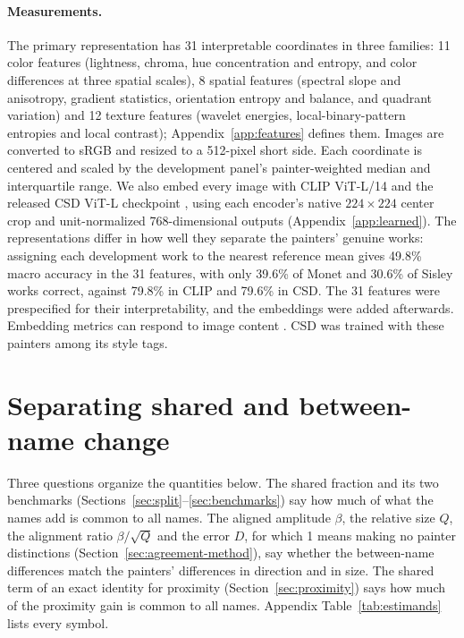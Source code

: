 \documentclass[10pt]{article}
\begin{document}
\paragraph{Measurements.}
The primary representation has 31 interpretable coordinates in three families: 11 color features
(lightness, chroma, hue concentration and entropy, and color differences at three spatial
scales), 8 spatial features (spectral slope and anisotropy, gradient statistics, orientation
entropy and balance, and quadrant variation) and 12 texture features (wavelet energies,
local-binary-pattern entropies and local contrast); Appendix~\ref{app:features} defines them.
Images are converted to sRGB and resized to a 512-pixel short side. Each coordinate is centered
and scaled by the development panel's painter-weighted median and interquartile range. We also
embed every image with CLIP ViT-L/14 \citep{radford2021} and the released CSD ViT-L checkpoint
\citep{somepalli2024style}, using each encoder's native $224\times224$ center crop and
unit-normalized 768-dimensional outputs (Appendix~\ref{app:learned}). The representations differ
in how well they separate the painters' genuine works: assigning each development work to the
nearest reference mean gives 49.8\% macro accuracy in the 31 features, with only 39.6\% of Monet
and 30.6\% of Sisley works correct, against 79.8\% in CLIP and 79.6\% in CSD. The 31 features
were prespecified for their interpretability, and the embeddings were added afterwards. Embedding
metrics can respond to image content \citep{kynkaanniemi2023role}. CSD was trained with these
painters among its style tags.

\section{Separating shared and between-name change}\label{sec:method}

Three questions organize the quantities below. The shared fraction and its two benchmarks
(Sections~\ref{sec:split}--\ref{sec:benchmarks}) say how much of what the names add is common to
all names. The aligned amplitude $\beta$, the relative size $Q$, the alignment ratio
$\beta/\sqrt{Q}$ and the error $D$, for which 1 means making no painter distinctions
(Section~\ref{sec:agreement-method}), say whether the between-name differences match the painters'
differences in direction and in size. The shared term of an exact identity for proximity
(Section~\ref{sec:proximity}) says how much of the proximity gain is common to all names. Appendix
Table~\ref{tab:estimands} lists every symbol.
\end{document}
